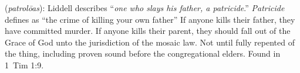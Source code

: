 \item[Father-murderer,]

(\textit{patrolōas}):
Liddell describes ``\emph{one who slays his father, a patricide}.'' \emph{Patricide} defines as ``the crime of killing your own father'' If anyone kills their father, they have committed murder. If anyone kills their parent, they should fall out of the Grace of God unto the jurisdiction of the mosaic law. Not until fully repented of the thing, including proven sound before the congregational elders.
Found in 1~Tim 1:9.
